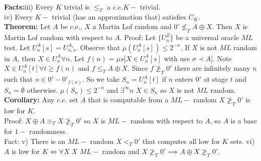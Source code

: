 \documentclass{article}
\begin{document}
  \textbf{Facts:}iii) Every $K$ trivial is $\leq_T$ a $c.e. K-$ trivial. \\
  iv) Every $K-$ trivial (has an approximation that) satisfies $C_K$. \\
  \textbf{Theorem:} Let $A$ be c.e., $X$ a Martin Lof random and $0' \not \leq_T A \oplus X$. Then $X$ is Martin Lof random with respect to $A$.
   Proof: Let $\{U_n^Z\}$ be a universal oracle $ML$ test. Let $U_n^A[s] = U_{n,s}^{A_s}$. Observe that $\mu(U_n^A[s]) \leq 2^{-n}$. If $X$ is not $ML$ random in $A$, then $X \in U_n^A \forall n$. Let $f(n) = \mu s [X \in U_n^A[s]$ with use $\sigma \prec A]$. Note $X \in U_n^A[t] \forall t \geq f(n)$ and $f \leq_TA\oplus X$. Since $f \not \geq_T0'$ there are infinitely many $n$ such that $n \in 0' - 0'_{f(n)}$. So we take $S_n = U_n^A[t]$ if $n$ enters $0'$ at stage $t$ and $S_n = \emptyset$ otherwise. $\mu(S_n) \leq 2^{-n}$ and $\exists^\infty n \; X \in S_n$ so $X$ is not $ML$ random.\\
   \textbf{Corollary:} Any $c.e.$ set $A$ that is computable from a $ML-$ random $X \not \geq_T 0'$ is low for $K$.\\
   Proof: $X \oplus A \equiv_T X \not \geq_T 0' $ so $X$ is $ML-$ random with respect to $A$, so $A$ is a base for $1-$ randomness.\\
   Fact: v) There is an $ML-$ random $X <_T 0'$ that computes all low for $K$ sets.
   vi) $A$ is low for $K \iff \forall X\; X$ $ML-$ random and $X \not \geq_T 0' \implies A \oplus X \not \geq_T 0'$.  
   \newpage
\end{document}
